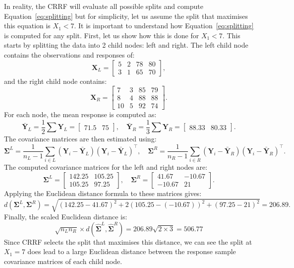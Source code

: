 \documentclass[11pt]{report} %
\begin{document}
In reality, the CRRF will evaluate all possible splits and compute Equation~\ref{eq:splitting} but for simplicity, let us assume the split that maximises this equation is \( X_1 < 7 \). It is important to understand how Equation~\ref{eq:splitting} is computed for any split. First, let us show how this is done for \( X_1 < 7 \). This starts by splitting the data into 2 child nodes: left and right. The left child node contains the observations and responses of:
\[
\mathbf{X}_L = 
\begin{bmatrix} 
5 & 2 & 78 & 80 \\ 
3 & 1 & 65 & 70 
\end{bmatrix},
\]
and the right child node contains:
\[
\mathbf{X}_R = 
\begin{bmatrix} 
7 & 3 & 85 & 79 \\ 
8 & 4 & 88 & 88 \\ 
10 & 5 & 92 & 74 
\end{bmatrix}.
\]
For each node, the mean response is computed as:
\[
\mathbf{\bar{Y}}_L = \frac{1}{2} \sum \mathbf{Y}_L = 
\begin{bmatrix} 
71.5 & 75 
\end{bmatrix}, \quad 
\mathbf{\bar{Y}}_R = \frac{1}{3} \sum \mathbf{Y}_R = 
\begin{bmatrix} 
88.33 & 80.33
\end{bmatrix}.
\]
The covariance matrices are then estimated using:
\[
\mathbf{\Sigma}^L = \frac{1}{n_L - 1} \sum_{i \in L} (\mathbf{Y}_i - \mathbf{\bar{Y}}_L)(\mathbf{Y}_i - \mathbf{\bar{Y}}_L)^\top, \quad 
\mathbf{\Sigma}^R = \frac{1}{n_R - 1} \sum_{i \in R} (\mathbf{Y}_i - \mathbf{\bar{Y}}_R)(\mathbf{Y}_i - \mathbf{\bar{Y}}_R)^\top.
\]
The computed covariance matrices for the left and right nodes are:
\[
\mathbf{\Sigma}^L = 
\begin{bmatrix} 
142.25 & 105.25 \\ 
105.25 & 97.25 
\end{bmatrix}, \quad 
\mathbf{\Sigma}^R = 
\begin{bmatrix} 
41.67 & -10.67 \\ 
-10.67 & 21 
\end{bmatrix}.
\]
Applying the Euclidean distance formula to these matrices gives: 
\[
d(\mathbf{\Sigma}^L, \mathbf{\Sigma}^R) = \sqrt{(142.25-41.67)^2 + 2(105.25 - (-10.67))^2 + (97.25 - 21)^2} = 206.89.
\]
Finally, the scaled Euclidean distance is:
\[
\sqrt{n_L n_R} \times d(\boldsymbol{\hat{\Sigma}}^{L}, \boldsymbol{\hat{\Sigma}}^{R}) = 206.89\sqrt{2 \times 3}=506.77
\]
Since CRRF selects the split that maximises this distance, we can see the split at \( X_1 = 7 \) does lead to a large Euclidean distance between the response sample covariance matrices of each child node.
\end{document}
